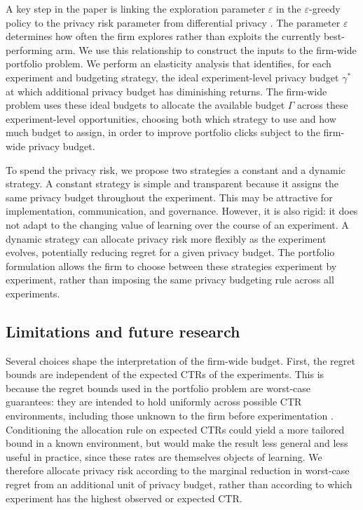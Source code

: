 \documentclass[mksc,nonblindrev]{informs3}
\begin{document}
A key step in the paper is linking the exploration parameter $\varepsilon$ in the $\varepsilon$-greedy policy to the privacy risk parameter from differential privacy \citep{Dwork_2014}. The parameter $\varepsilon$ determines how often the firm explores rather than exploits the currently best-performing arm. We use this relationship to construct the inputs to the firm-wide portfolio problem. We perform an elasticity analysis that identifies, for each experiment and budgeting strategy, the ideal experiment-level privacy budget $\gamma^*$ at which additional privacy budget has diminishing returns. The firm-wide problem uses these ideal budgets to allocate the available budget $\Gamma$ across these experiment-level opportunities, choosing both which strategy to use and how much budget to assign, in order to improve portfolio clicks subject to the firm-wide privacy budget.

To spend the privacy risk, we propose two strategies a constant and a dynamic strategy. A constant strategy is simple and transparent because it assigns the same privacy budget throughout the experiment. This may be attractive for implementation, communication, and governance. However, it is also rigid: it does not adapt to the changing value of learning over the course of an experiment. A dynamic strategy can allocate privacy risk more flexibly as the experiment evolves, potentially reducing regret for a given privacy budget. The portfolio formulation allows the firm to choose between these strategies experiment by experiment, rather than imposing the same privacy budgeting rule across all experiments.

\subsection{Limitations and future research}
Several choices shape the interpretation of the firm-wide budget. First, the regret bounds are independent of the expected CTRs of the experiments. This is because the regret bounds used in the portfolio problem are worst-case guarantees: they are intended to hold uniformly across possible CTR environments, including those unknown to the firm before experimentation \citep[cf.][]{Joonhwi_2025}. Conditioning the allocation rule on expected CTRs could yield a more tailored bound in a known environment, but would make the result less general and less useful in practice, since these rates are themselves objects of learning. We therefore allocate privacy risk according to the marginal reduction in worst-case regret from an additional unit of privacy budget, rather than according to which experiment has the highest observed or expected CTR.
\end{document}
